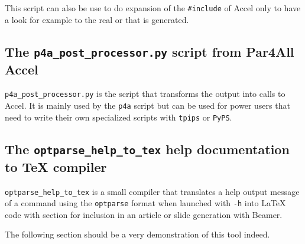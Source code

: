 \documentclass[a4paper]{article}
\begin{document}
This script can also be use to do expansion of the \verb|#include| of
\Apfa Accel only to have a look for example to the real \Acuda or \Aopenmp
that is generated.




\subsection{The \protect\texttt{p4a\_post\_processor.py} script from
  Par4All Accel}
\label{sec:p4a_p-script-from}

\verb|p4a_post_processor.py| is the script that transforms the \Apips
output into calls to \Apfa Accel. It is mainly used by the \texttt{p4a}
script but can be used for power users that need to write their own
specialized \Apips scripts with \texttt{tpips} or \texttt{PyPS}.




\subsection{The \protect\texttt{optparse\_help\_to\_tex} help
  documentation to \TeX{} compiler}
\label{sec:help-docum-tex}

\verb|optparse_help_to_tex| is a small compiler that translates a help
output message of a command using the \texttt{optparse} format when
launched with \texttt{-h} into La\TeX{} code with section for inclusion in
an article or slide generation with Beamer.

The following section should be a very demonstration of this tool
indeed. \smiley



\end{document}

